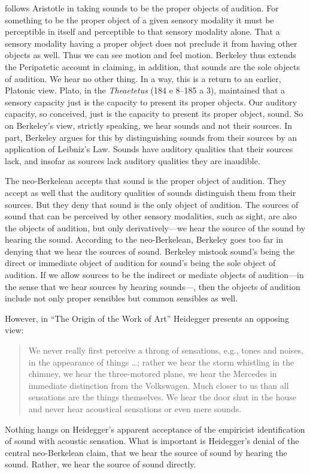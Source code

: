 \citet{Berkeley:1734fk} follows Aristotle in taking sounds to be the proper objects of audition. For something to be the proper object of a given sensory modality it must be perceptible in itself and perceptible to that sensory modality alone. That a sensory modality having a proper object does not preclude it from having other objects as well. Thus we can see motion and feel motion. Berkeley thus extends the Peripatetic account in claiming, in addition, that sounds are the sole objects of audition. We hear no other thing. In a way, this is a return to an earlier, Platonic view. Plato, in the \emph{Theaetetus} (184 e 8--185 a 3), maintained that a sensory capacity just is the capacity to present its proper objects. Our auditory capacity, so conceived, just is the capacity to present its proper object, sound. So on Berkeley's view, strictly speaking, we hear sounds and not their sources. In part, Berkeley argues for this by distinguishing sounds from their sources by an application of Leibniz's Law. Sounds have auditory qualities that their sources lack, and insofar as sources lack auditory qualities they are inaudible. 


The neo-Berkelean accepts that sound is the proper object of audition. They accept as well that the auditory qualities of sounds distinguish them from their sources. But they deny that sound is the only object of audition. The sources of sound that can be perceived by other sensory modalities, such as sight, are also the objects of audition, but only derivatively---we hear the source of the sound by hearing the sound. According to the neo-Berkelean, Berkeley goes too far in denying that we hear the sources of sound. Berkeley mistook sound's being the direct or immediate object of audition for sound's being the sole object of audition. If we allow sources to be the indirect or mediate objects of audition---in the sense that we hear sources by hearing sounds---, then the objects of audition include not only proper sensibles but common sensibles as well.

However, in ``The Origin of the Work of Art'' Heidegger presents an opposing view:
\begin{quote}
    We never really first perceive a throng of sensations, e.g., tones and noises, in the appearance of things \ldots; rather we hear the storm whistling in the chimney, we hear the three-motored plane, we hear the Mercedes in immediate distinction from the Volkswagen. Much closer to us than all sensations are the things themselves. We hear the door shut in the house and never hear acoustical sensations or even mere sounds. \citep[151--152]{Heidegger:1935uq}
\end{quote}
Nothing hangs on Heidegger's apparent acceptance of the empiricist identification of sound with acoustic sensation. What is important is Heidegger's denial of the central neo-Berkelean claim, that we hear the source of sound by hearing the sound. Rather, we hear the source of sound directly.

